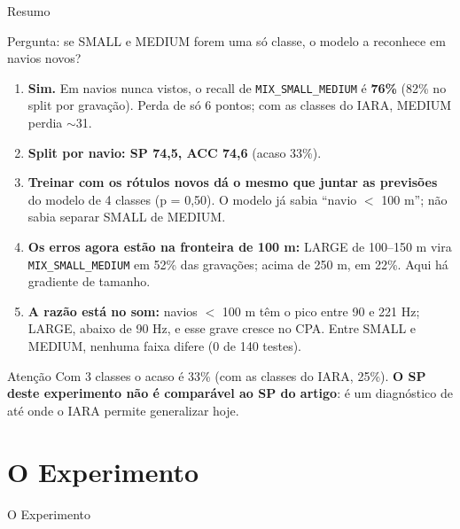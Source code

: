 \documentclass[aspectratio=169]{beamer}
\newcommand{\mix}{\texttt{MIX\_SMALL\_MEDIUM}}
\begin{document}
\begin{frame}{Resumo}
    \footnotesize
    \begin{block}{\small Pergunta: se SMALL e MEDIUM forem uma só classe, o modelo a reconhece em navios novos?}
        \scriptsize
        \begin{enumerate}
            \setlength{\itemsep}{3pt}
            \item \textbf{Sim.} Em navios nunca vistos, o recall de \mix{} é \textbf{76\%} (82\% no split por gravação). Perda de só 6 pontos; com as classes do IARA, MEDIUM perdia $\sim$31.
            \item \textbf{Split por navio: SP 74,5, ACC 74,6} (acaso 33\%).
            \item \textbf{Treinar com os rótulos novos dá o mesmo que juntar as previsões} do modelo de 4 classes (p = 0,50). O modelo já sabia ``navio $<$ 100 m''; não sabia separar SMALL de MEDIUM.
            \item \textbf{Os erros agora estão na fronteira de 100 m:} LARGE de 100--150 m vira \mix{} em 52\% das gravações; acima de 250 m, em 22\%. Aqui há gradiente de tamanho.
            \item \textbf{A razão está no som:} navios $<$ 100 m têm o pico entre 90 e 221 Hz; LARGE, abaixo de 90 Hz, e esse grave cresce no CPA. Entre SMALL e MEDIUM, nenhuma faixa difere (0 de 140 testes).
        \end{enumerate}
    \end{block}
    \begin{alertblock}{\small Atenção}
        \scriptsize
        Com 3 classes o acaso é 33\% (com as classes do IARA, 25\%). \textbf{O SP deste experimento não é comparável ao SP do artigo}: é um diagnóstico de até onde o IARA permite generalizar hoje.
    \end{alertblock}
\end{frame}

\section{O Experimento}

\begin{frame}
    \centering
    \huge O Experimento
\end{frame}
\end{document}
